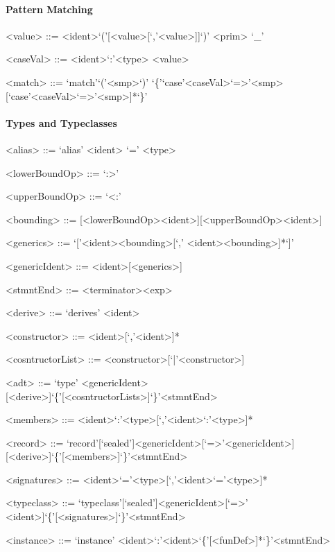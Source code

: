 \documentclass[11pt]{article} %
\begin{document}
\paragraph{Pattern Matching}

\begin{grammar}

<value> ::= <ident>`('[<value>[`,'<value>]]`)'
\alt <prim>
\alt `\_'

<caseVal> ::= <ident>`:'<type>
\alt <value>

<match> ::= `match'`('<smp>`)' `\{'`case'<caseVal>`=>'<smp>[`case'<caseVal>`=>'<smp>]*`\}'

\end{grammar}

\paragraph{Types and Typeclasses}

\begin{grammar}

<alias> ::= `alias' <ident> `=' <type>

<lowerBoundOp> ::= `:>'

<upperBoundOp> ::= `<:'

<bounding> ::= [<lowerBoundOp><ident>][<upperBoundOp><ident>]

<generics> ::= `['<ident><bounding>[`,' <ident><bounding>]*`]'

<genericIdent> ::= <ident>[<generics>]

<stmntEnd> ::= <terminator><exp>

<derive> ::= `derives' <ident>

<constructor> ::= <ident>[`,'<ident>]*

<cosntructorList> ::= <constructor>[`|'<constructor>]

<adt> ::= `type' <genericIdent>[<derive>]`\{'[<cosntructorLists>]`\}'<stmntEnd>

<members> ::= <ident>`:'<type>[`,'<ident>`:'<type>]*

<record> ::= `record'[`sealed']<genericIdent>[`=>'<genericIdent>][<derive>]`\{'[<members>]`\}'<stmntEnd>

<signatures> ::= <ident>`='<type>[`,'<ident>`='<type>]*
 
<typeclass> ::= `typeclass'[`sealed']<genericIdent>[`=>' <ident>]`\{'[<signatures>]`\}'<stmntEnd>

<instance> ::= `instance' <ident>`:'<ident>`\{'[<funDef>]*`\}'<stmntEnd>

\end{grammar}
\end{document}
